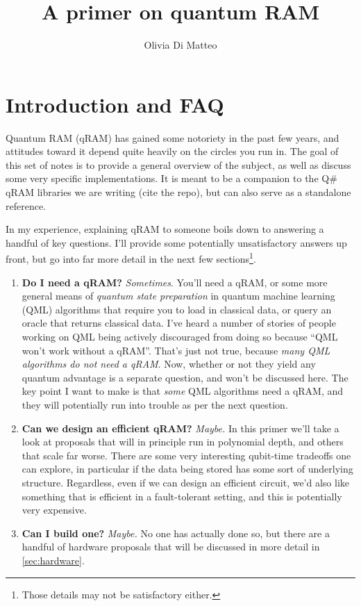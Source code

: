 \documentclass[a4paper,12pt]{article}
\title{A primer on quantum RAM}
\author{Olivia Di Matteo}
\begin{document}
\maketitle

\setcounter{tocdepth}{4}
\setcounter{secnumdepth}{4}
\tableofcontents

\section{Introduction and FAQ}

Quantum RAM (qRAM) has gained some notoriety in the past few years, and attitudes toward it depend quite heavily on the circles you run in. The goal of this set of notes is to provide a general overview of the subject, as well as discuss some very specific implementations. It is meant to be a companion to the Q\# qRAM libraries we are writing (cite the repo), but can also serve as a standalone reference.


In my experience, explaining qRAM to someone boils down to answering a handful of key questions. I'll provide some potentially unsatisfactory answers up front, but go into far more detail in the next few sections\footnote{Those details may not be satisfactory either.}.

\begin{enumerate} 
 \item \textbf{Do I need a qRAM?}
  \emph{Sometimes}. You'll need a qRAM, or some more general means of \emph{quantum state preparation} in quantum machine learning (QML) algorithms that require you to load in classical data, or query an oracle that returns classical data. I've heard a number of stories of people working on QML being actively discouraged from doing so because ``QML won't work without a qRAM''. That's just not true, because \emph{many QML algorithms do not need a qRAM}. Now, whether or not they yield any quantum advantage is a separate question, and won't be discussed here. The key point I want to make is that \emph{some} QML algorithms need a qRAM, and they will potentially run into trouble as per the next question.
 \item \textbf{Can we design an efficient qRAM?} \emph{Maybe.} In this primer we'll take a look at proposals that will in principle run in polynomial depth, and others that scale far worse. There are some very interesting qubit-time tradeoffs one can explore, in particular if the data being stored has some sort of underlying structure. Regardless, even if we can design an efficient circuit, we'd also like something that is efficient in a fault-tolerant setting, and this is potentially very expensive.
 \item \textbf{Can I build one?} \emph{Maybe.} No one has actually done so, but there are a handful of hardware proposals that will be discussed in more detail in \autoref{sec:hardware}. 
\end{enumerate}
\end{document}
